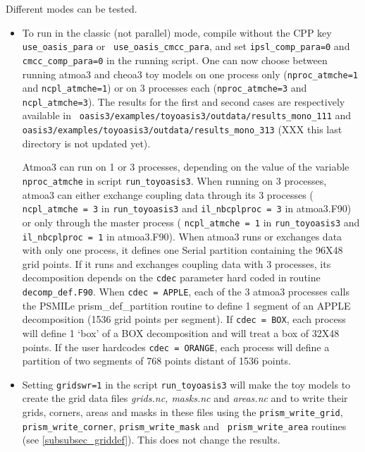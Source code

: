 Different modes can be tested. 
\begin{itemize}
\item To run in the classic (not parallel) mode, compile
  without the CPP key {\tt use\_oasis\_para} or {\tt
    use\_oasis\_cmcc\_para}, and set {\tt ipsl\_comp\_para=0} and {\tt
    cmcc\_comp\_para=0} in the running script. One can now choose
  between running atmoa3 and cheoa3 toy models on one process only
  ({\tt nproc\_atmche=1} and {\tt ncpl\_atmche=1}) or on 3 processes
  each ({\tt nproc\_atmche=3} and {\tt ncpl\_atmche=3}). The results
  for the first and second cases are respectively available in {\tt
    oasis3/examples/toyoasis3/outdata/results\_mono\_111} and \break
  {\tt oasis3/examples/toyoasis3/outdata/results\_mono\_313} 
  (XXX this last directory is not updated yet).

 Atmoa3 can run on 1 or 3 processes,
depending on the value of the variable {\tt nproc\_atmche} in script {\tt run\_toyoasis3}. 
When running on 3 processes, atmoa3 can either exchange coupling data
through its 3 processes ( {\tt ncpl\_atmche = 3} in {\tt run\_toyoasis3} and  {\tt il\_nbcplproc = 3} in atmoa3.F90) or only 
through the master process ( {\tt ncpl\_atmche = 1} in {\tt run\_toyoasis3} and  {\tt il\_nbcplproc = 1} in atmoa3.F90). 
When atmoa3 runs or exchanges data with only one process, it defines
one Serial partition containing the 96X48 grid points. If it runs and exchanges
coupling data with 3 processes, its decomposition
depends on the {\tt cdec} parameter hard coded in routine {\tt decomp\_def.F90}.
When {\tt cdec = APPLE}, each of the 3 atmoa3 processes calls the PSMILe
prism\_def\_partition routine to define 1 segment of an APPLE
decomposition (1536 grid points per segment). If {\tt cdec = BOX}, each process will define 1
`box' of a BOX decomposition and will treat a box of
32X48 points.
If the user hardcodes {\tt cdec = ORANGE}, each process will define a
partition of two segments of 768 points distant of 1536 points.

\item Setting {\tt gridswr=1} in the script {\tt run\_toyoasis3} will make
the toy models to create the grid data files {\em grids.nc, masks.nc}
and {\em areas.nc} and to write their grids, corners, areas and masks
in these files using the {\tt prism\_write\_grid}, {\tt
  prism\_write\_corner}, {\tt prism\_write\_mask} and {\tt
  prism\_write\_area} routines (see \ref{subsubsec_griddef}). This
does not change the results.


\end{itemize}
